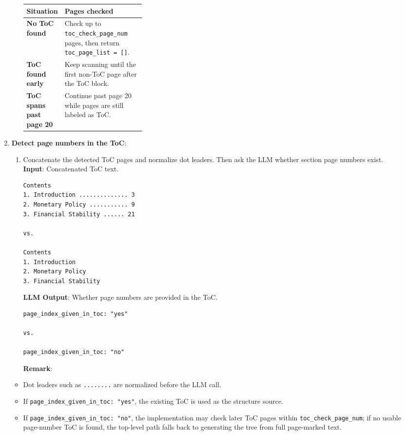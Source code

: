 \documentclass[11pt,a4paper]{article}
\newcommand{\fieldname}[1]{\textcolor{red!70!black}{\texttt{#1}}}
\begin{document}
\begin{enumerate}
\begin{itemize}
        \begin{tabularx}{\linewidth}{@{}p{0.30\linewidth}X@{}}
        \toprule
        \textbf{Situation} & \textbf{Pages checked} \\
        \midrule
        \textbf{No ToC found} & Check up to \fieldname{toc\_check\_page\_num} pages, then return \texttt{toc\_page\_list = []}. \\
        \textbf{ToC found early} & Keep scanning until the first non-ToC page after the ToC block. \\
        \textbf{ToC spans past page 20} & Continue past page 20 while pages are still labeled as ToC. \\
        \bottomrule
        \end{tabularx}
\end{itemize}
    
    

    \item \textbf{Detect page numbers in the ToC}: 
    \begin{enumerate}
    \item Concatenate the detected ToC pages and normalize dot leaders. Then ask the LLM whether section page numbers exist. \\
\textbf{Input}: Concatenated ToC text. \\
\begin{lstlisting}[style=pageTextBlockInList]
Contents
1. Introduction .............. 3
2. Monetary Policy ........... 9
3. Financial Stability ...... 21

vs.

Contents
1. Introduction
2. Monetary Policy
3. Financial Stability
\end{lstlisting}
    \textbf{LLM Output}: Whether page numbers are provided in the ToC.
\begin{lstlisting}[style=pageTextBlockInList]
page_index_given_in_toc: "yes"

vs.

page_index_given_in_toc: "no"
\end{lstlisting}
    \textbf{Remark}:
    \end{enumerate}
\begin{itemize}
        \item Dot leaders such as \texttt{........} are normalized before the LLM call.
        \item If \texttt{page\_index\_given\_in\_toc: "yes"}, the existing ToC is used as the structure source.
        \item If \texttt{page\_index\_given\_in\_toc: "no"}, the implementation may check later ToC pages within \fieldname{toc\_check\_page\_num}; if no usable page-number ToC is found, the top-level path falls back to generating the tree from full page-marked text.
\end{itemize}
    

\end{enumerate}
\end{document}
